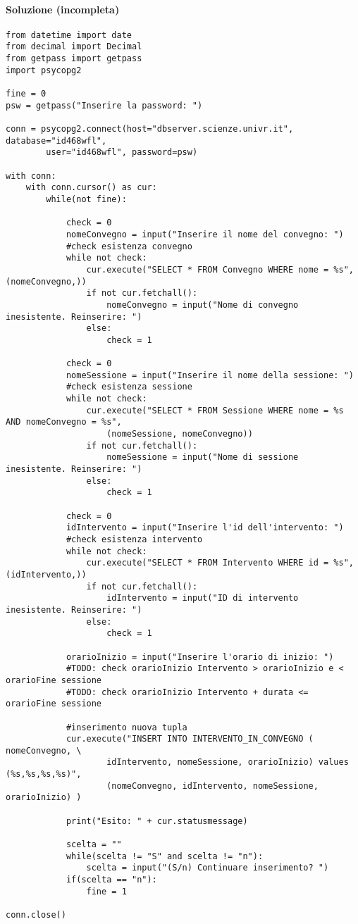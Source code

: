 \documentclass[a4paper, 10pt, titlepage]{article}
\begin{document}
\paragraph{Soluzione (incompleta)}\dotfill
\lstset{language=Python}
\begin{footnotesize}
\begin{lstlisting}[tabsize=2]
from datetime import date
from decimal import Decimal
from getpass import getpass
import psycopg2

fine = 0
psw = getpass("Inserire la password: ")

conn = psycopg2.connect(host="dbserver.scienze.univr.it", database="id468wfl", 
		user="id468wfl", password=psw)

with conn:
	with conn.cursor() as cur:
		while(not fine):

			check = 0
			nomeConvegno = input("Inserire il nome del convegno: ")
			#check esistenza convegno
			while not check:
				cur.execute("SELECT * FROM Convegno WHERE nome = %s", (nomeConvegno,))
				if not cur.fetchall():
					nomeConvegno = input("Nome di convegno inesistente. Reinserire: ")
				else:
					check = 1

			check = 0
			nomeSessione = input("Inserire il nome della sessione: ")
			#check esistenza sessione
			while not check:
				cur.execute("SELECT * FROM Sessione WHERE nome = %s AND nomeConvegno = %s",
					(nomeSessione, nomeConvegno))
				if not cur.fetchall():
					nomeSessione = input("Nome di sessione inesistente. Reinserire: ")
				else:
					check = 1

			check = 0
			idIntervento = input("Inserire l'id dell'intervento: ")
			#check esistenza intervento
			while not check:
				cur.execute("SELECT * FROM Intervento WHERE id = %s", (idIntervento,))
				if not cur.fetchall():
					idIntervento = input("ID di intervento inesistente. Reinserire: ")
				else:
					check = 1

			orarioInizio = input("Inserire l'orario di inizio: ")
			#TODO: check orarioInizio Intervento > orarioInizio e < orarioFine sessione
			#TODO: check orarioInizio Intervento + durata <= orarioFine sessione

			#inserimento nuova tupla
			cur.execute("INSERT INTO INTERVENTO_IN_CONVEGNO ( nomeConvegno, \
					idIntervento, nomeSessione, orarioInizio) values (%s,%s,%s,%s)", 
					(nomeConvegno, idIntervento, nomeSessione, orarioInizio) )
			
			print("Esito: " + cur.statusmessage)
			
			scelta = "" 
			while(scelta != "S" and scelta != "n"):
				scelta = input("(S/n) Continuare inserimento? ")
			if(scelta == "n"):
				fine = 1
				
conn.close()
\end{lstlisting}
\end{footnotesize}
\end{document}
